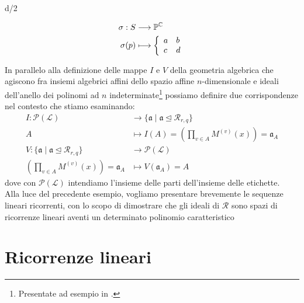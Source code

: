 \llcorner d/2 \lrcorner


    \begin{align*}
      \sigma :S  &\longrightarrow \mathbb{P}^{\mathbb{C}} \\
      \sigma(p) &\longmapsto  
      \left\{ \begin{array}{l l}
                 a & b \\
                 c & d
              \end{array} \right. 
    \end{align*} 
    
    
    
    
    
    In parallelo alla definizione delle mappe $I$ e $V$ della geometria algebrica che agiscono fra insiemi algebrici affini dello spazio affine $n$-dimensionale e ideali dell'anello dei polinomi ad $n$ indeterminate\footnote{Presentate ad esempio in .} possiamo definire due corrispondenze nel contesto che stiamo esaminando:
\begin{align*}
   I: \mathcal{P}(\mathscr{L})  &\longrightarrow  
                       \lbrace \mathfrak{a} \mid \mathfrak{a} \trianglelefteq \mathcal{R}_{r,q} \rbrace  \\
              A &\longmapsto I(A) = (\prod_{v\in A} M^{(v)}(x)) = \mathfrak{a}_{A} \\
   V: \lbrace \mathfrak{a} \mid \mathfrak{a} \trianglelefteq \mathcal{R}_{r,q} \rbrace  &\longrightarrow   
	                \mathcal{P}(\mathscr{L})  \\
              (\prod_{v\in A} M^{(v)}(x)) = \mathfrak{a}_{A}  &\longmapsto V(\mathfrak{a}_{A}) = A 
\end{align*}
dove con $\mathcal{P}(\mathscr{L})$ intendiamo l'insieme delle parti dell'insieme delle etichette.\\


Alla luce del precedente esempio, vogliamo presentare brevemente le sequenze lineari ricorrenti, con lo scopo di dimostrare che gli ideali di $\mathcal{R}$ sono spazi di ricorrenze lineari aventi un determinato polinomio caratteristico



\section{Ricorrenze lineari}

